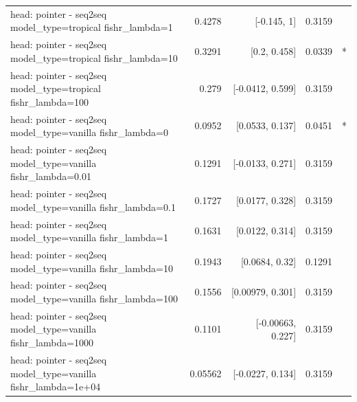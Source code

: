 \documentclass[10pt]{article}
\makeatletter
\newcommand{\stackcell}[1]{\begin{tabular}[t]{@{}l@{}}#1\end{tabular}}
\makeatother
\begin{document}
{\begin{longtable}{lrrrl}
\stackcell{head: pointer - seq2seq\\\footnotesize model\_type=tropical fishr\_lambda=1 } & 0.4278 & [-0.145, 1] & 0.3159 & \\
\stackcell{head: pointer - seq2seq\\\footnotesize model\_type=tropical fishr\_lambda=10 } & 0.3291 & [0.2, 0.458] & 0.0339 & *\\
\stackcell{head: pointer - seq2seq\\\footnotesize model\_type=tropical fishr\_lambda=100 } & 0.279 & [-0.0412, 0.599] & 0.3159 & \\
\stackcell{head: pointer - seq2seq\\\footnotesize model\_type=vanilla fishr\_lambda=0 } & 0.0952 & [0.0533, 0.137] & 0.0451 & *\\
\stackcell{head: pointer - seq2seq\\\footnotesize model\_type=vanilla fishr\_lambda=0.01 } & 0.1291 & [-0.0133, 0.271] & 0.3159 & \\
\stackcell{head: pointer - seq2seq\\\footnotesize model\_type=vanilla fishr\_lambda=0.1 } & 0.1727 & [0.0177, 0.328] & 0.3159 & \\
\stackcell{head: pointer - seq2seq\\\footnotesize model\_type=vanilla fishr\_lambda=1 } & 0.1631 & [0.0122, 0.314] & 0.3159 & \\
\stackcell{head: pointer - seq2seq\\\footnotesize model\_type=vanilla fishr\_lambda=10 } & 0.1943 & [0.0684, 0.32] & 0.1291 & \\
\stackcell{head: pointer - seq2seq\\\footnotesize model\_type=vanilla fishr\_lambda=100 } & 0.1556 & [0.00979, 0.301] & 0.3159 & \\
\stackcell{head: pointer - seq2seq\\\footnotesize model\_type=vanilla fishr\_lambda=1000 } & 0.1101 & [-0.00663, 0.227] & 0.3159 & \\
\stackcell{head: pointer - seq2seq\\\footnotesize model\_type=vanilla fishr\_lambda=1e+04 } & 0.05562 & [-0.0227, 0.134] & 0.3159 & \\
\bottomrule
\end{longtable}
}
\end{document}
